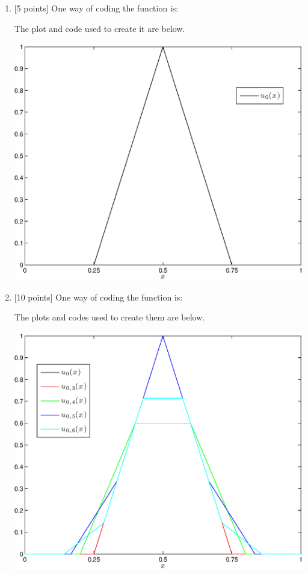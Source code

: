 \begin{solution}
\begin{enumerate}
\item {[5 points]}  One way of coding the function is:



The plot and code used to create it are below.

\begin{center}
\includegraphics[scale=0.7]{hw49a.eps}
\end{center}



\item {[10 points]} One way of coding the function is:



The plots and codes used to create them are below.

\begin{center}
\includegraphics[scale=0.7]{hw49b1.eps}
\end{center}


\end{enumerate}
\end{solution}
